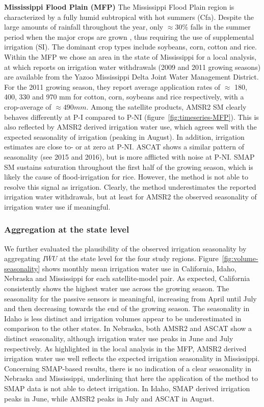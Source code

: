 \documentclass[hess, manuscript]{copernicus}
\begin{document}
\textbf{Mississippi Flood Plain (MFP)}
The Mississippi Flood Plain region is characterized by a fully humid subtropical with hot summers (Cfa). Despite the large amounts of rainfall throughout the year, only $\approx 30\%$ falls in the summer period when the major crops are grown \citep{kebede2014irrigation}, thus requiring the use of supplemental irrigation (SI). The dominant crop types include soybeans, corn, cotton and rice. Within the MFP we chose an area in the state of Mississippi for a local analysis, at which reports on irrigation water withdrawals (2009 and 2011 growing seasons) are available from the Yazoo Mississippi Delta Joint Water Management District. For the 2011 growing season, they report average application rates of $\approx$ 180, 400, 330 and 970 mm for cotton, corn, soybeans and rice respectively, with a crop-average of $\approx 490 mm$. Among the satellite products, AMSR2 SM clearly behaves differently at P-I compared to P-NI (figure~\ref{fig:timeseries-MFP}). This is also reflected by AMSR2 derived irrigation water use, which agrees well with the expected seasonality of irrigation (peaking in August). In addition, irrigation estimates are close to- or at zero at P-NI. ASCAT shows a similar pattern of seasonality (see 2015 and 2016), but is more afflicted with noise at P-NI. SMAP SM sustains saturation throughout the first half of the growing season, which is likely the cause of flood-irrigation for rice. However, the method is not able to resolve this signal as irrigation. Clearly, the method underestimates the reported irrigation water withdrawals, but at least for AMSR2 the observed seasonality of irrigation water use if meaningful.

\subsubsection{Aggregation at the state level}
\label{sssec:seasonality-aggregated}
We further evaluated the plausibility of the observed irrigation seasonality by aggregating $\overline{IWU}$ at the state level for the four study regions. Figure~\ref{fig:volume-seasonality} shows monthly mean irrigation water use in California, Idaho, Nebraska and Mississippi for each satellite-model pair. As expected, California consistently shows the highest water use across the growing season. The seasonality for the passive sensors is meaningful, increasing from April until July and then decreasing towards the end of the growing season. The seasonality in Idaho is less distinct and irrigation volumes appear to be underestimated in comparison to the other states. In Nebraska, both AMSR2 and ASCAT show a distinct seasonality, although irrigation water use peaks in June and July respectively. As highlighted in the local analysis in the MFP, AMSR2 derived irrigation water use well reflects the expected irrigation seasonality in Mississippi. Concerning SMAP-based results, there is no indication of a clear seasonality in Nebraska and Mississippi, underlining that here the application of the method to SMAP data is not able to detect irrigation. In Idaho, SMAP derived irrigation peaks in June, while AMSR2 peaks in July and ASCAT in August.
\end{document}
